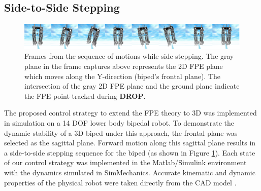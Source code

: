 
\subsection{Side-to-Side Stepping} %
\label{sub:3d_simulations}

\begin{figure}[t]
	\centering
    \includegraphics[scale=0.11]{fig/ch4/sequence.png}
  	\caption{Frames from the sequence of motions while side stepping. The gray plane in the frame captures above represents the 2D FPE plane which moves along the Y-direction (biped's frontal plane). The intersection of the gray 2D FPE plane and the ground plane indicate the FPE point tracked during \textbf{DROP}. }
	\label{fig:sequence}
\end{figure}


The proposed control strategy to extend the FPE theory to 3D was implemented in simulation on a 14 DOF lower body bipedal robot. To demonstrate the dynamic stability of a 3D biped under this approach, the frontal plane was selected as the sagittal plane. Forward motion along this sagittal plane results in a side-to-side stepping sequence for the biped (as shown in Figure \ref{fig:sequence}). Each state of our control strategy was implemented in the Matlab/Simulink environment with the dynamics simulated in SimMechanics. Accurate kinematic and dynamic properties of the physical robot were taken directly from the CAD model \cite{ChoudhuryHumanoids2012}.

